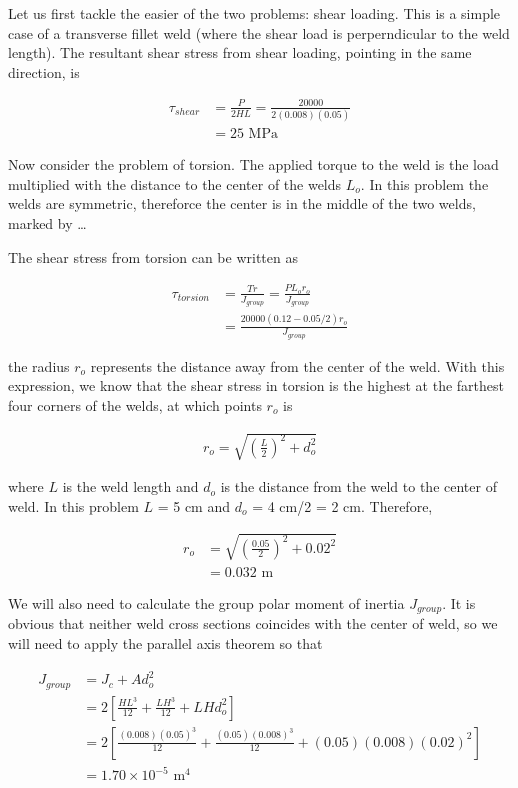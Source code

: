 \documentclass[a4paper,openany,12pt]{book}
\begin{document}
{{Let us first tackle the easier of the two problems: shear loading. This
is a simple case of a transverse fillet weld (where the shear load is
perperndicular to the weld length). The resultant shear stress from
shear loading, pointing in the same direction, is

$$\begin{aligned}
    \tau_{shear} &= \frac{P}{2HL} = \frac{20000}{2(0.008)(0.05)} \\
                 &= 25 \text{ MPa}
  \end{aligned}$$

Now consider the problem of torsion. The applied torque to the weld is
the load multiplied with the distance to the center of the welds \(L_o\).
In this problem the welds are symmetric, thereforce the center is in the
middle of the two welds, marked by \ldots{}

The shear stress from torsion can be written as

$$\begin{aligned}
    \tau_{torsion} &= \frac{Tr}{J_{group}} = \frac{P L_o r_o}{J_{group}} \\
                   &= \frac{20000(0.12-0.05/2) r_o}{J_{group}}
  \end{aligned}$$

the radius \(r_o\) represents the distance away from the center of the
weld. With this expression, we know that the shear stress in torsion is
the highest at the farthest four corners of the welds, at which points
\(r_o\) is

$$\begin{aligned}
    r_o = \sqrt{ \left( \frac{L}{2} \right)^2 + d_o^2 }
  \end{aligned}$$

where \(L\) is the weld length and \(d_o\) is the distance from the weld to
the center of weld. In this problem \(L\) = 5 cm and \(d_o\) = 4 cm/2 = 2
cm. Therefore,

$$\begin{aligned}
     r_o &= \sqrt{ \left( \frac{0.05}{2} \right)^2 + 0.02^2 } \\
         &= 0.032 \text{ m}
   \end{aligned}$$

We will also need to calculate the group polar moment of inertia
\(J_{group}\). It is obvious that neither weld cross sections coincides
with the center of weld, so we will need to apply the parallel axis
theorem so that

$$\begin{aligned}
     J_{group} &= J_c + A d_o^2 \\
               &= 2 \left[ \frac{HL^3}{12} +\frac{LH^3}{12} + LHd_o^2 \right] \\
               &= 2 \left[ \frac{(0.008)(0.05)^3}{12} + \frac{(0.05)(0.008)^3}{12} + (0.05)(0.008)(0.02)^2 \right] \\
               &= 1.70 \times 10^{-5} \text{ m}^4
   \end{aligned}$$

}}
\end{document}
